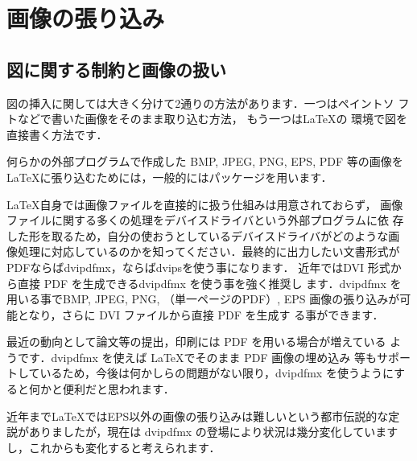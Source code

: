 \chapter{画像の張り込み}

\section{図に関する制約と画像の扱い}\label{sec:figure}

図の挿入に関しては大きく分けて2通りの方法があります．一つはペイントソ
フトなどで書いた画像をそのまま取り込む方法， もう一つは{\LaTeX}の
環境で図を直接書く方法です．


何らかの外部プログラムで作成した BMP, JPEG, PNG, EPS, PDF 等の画像を
\LaTeX に張り込むためには，一般的にはパッケージを用います．

\LaTeX 自身では画像ファイルを直接的に扱う仕組みは用意されておらず，
画像ファイルに関する多くの処理をデバイスドライバという外部プログラムに依
存した形を取るため，自分の使おうとしているデバイスドライバがどのような画
像処理に対応しているのかを知ってください．最終的に出力したい文書形式が
PDFならば{dvipdfmx}，\PS ならば{dvips}を使う事になります．
近年ではDVI 形式から直接 PDF を生成できるdvipdfmx を使う事を強く推奨し
ます．dvipdfmx を用いる事でBMP, JPEG, PNG, （単一ページのPDF）, 
EPS 画像の張り込みが可能となり，さらに DVI ファイルから直接 PDF を生成す
る事ができます．

最近の動向として論文等の提出，印刷には PDF を用いる場合が増えている
ようです．dvipdfmx を使えば \LaTeX でそのまま PDF 画像の埋め込み
等もサポートしているため，今後は何かしらの問題がない限り，dvipdfmx 
を使うようにすると何かと便利だと思われます．
%

近年まで{\LaTeX}ではEPS以外の画像の張り込みは難しいという都市伝説的な定
説がありましたが，現在は dvipdfmx の登場により状況は幾分変化しています
し，これからも変化すると考えられます．



